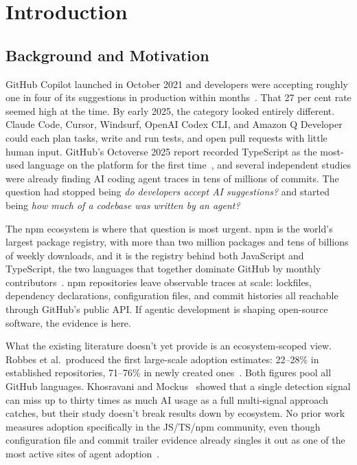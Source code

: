 
\chapter{Introduction}
\label{chap:intro}

\section{Background and Motivation}
\label{sec:intro:background}

GitHub Copilot launched in October 2021 and developers were accepting roughly one in four of its suggestions in production within months~\cite{ziegler2022}. That 27 per cent rate seemed high at the time. By early 2025, the category looked entirely different. Claude Code, Cursor, Windsurf, OpenAI Codex CLI, and Amazon Q Developer could each plan tasks, write and run tests, and open pull requests with little human input. GitHub's Octoverse 2025 report recorded TypeScript as the most-used language on the platform for the first time~\cite{octoverse2025}, and several independent studies were already finding AI coding agent traces in tens of millions of commits. The question had stopped being \emph{do developers accept AI suggestions?} and started being \emph{how much of a codebase was written by an agent?}

The npm ecosystem is where that question is most urgent. npm is the world's largest package registry, with more than two million packages and tens of billions of weekly downloads, and it is the registry behind both JavaScript and TypeScript, the two languages that together dominate GitHub by monthly contributors~\cite{octoverse2025}. npm repositories leave observable traces at scale: lockfiles, dependency declarations, configuration files, and commit histories all reachable through GitHub's public API. If agentic development is shaping open-source software, the evidence is here.

What the existing literature doesn't yet provide is an ecosystem-scoped view. Robbes et al.\ produced the first large-scale adoption estimates: 22--28\% in established repositories, 71--76\% in newly created ones~\cite{robbesAgenticMuch2026, robbesAgenticVery2026}. Both figures pool all GitHub languages. Khosravani and Mockus~\cite{khosravani2026} showed that a single detection signal can miss up to thirty times as much AI usage as a full multi-signal approach catches, but their study doesn't break results down by ecosystem. No prior work measures adoption specifically in the JS/TS/npm community, even though configuration file and commit trailer evidence already singles it out as one of the most active sites of agent adoption~\cite{galsterConfig2026, octoverse2025}.

